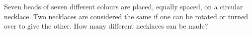 Seven beads of seven different colours are placed, equally spaced, on a circular necklace. Two necklaces are considered the same if one can be rotated or turned over to give the other. How many different necklaces can be made?
